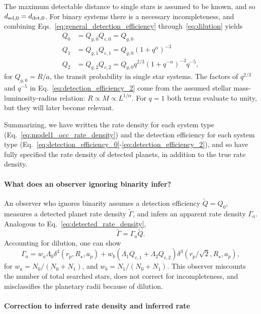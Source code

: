 The maximum detectable distance to single stars is assumed to be known, and so 
$d_{{\rm sel},0} = d_{{\rm det},0}$.
For binary systems there is a necessary incompleteness, and combining 
Eqs.~\ref{eq:general_detection_efficiency} through~\ref{eq:dilution} yields
\begin{align}
Q_0 &= Q_{g,0}Q_{c,0} = Q_{g,0} \label{eq:detection_efficiency_0}\\
Q_1 &= Q_{g,1}Q_{c,1} = Q_{g,0} (1+q^\alpha)^{-3} \\
Q_2 &= Q_{g,2}Q_{c,2} = Q_{g,0} q^{2/3} (1+q^{-\alpha})^{-3} q^{-5}, 
\label{eq:detection_efficiency_2}
\end{align}
for $Q_{g,0}=R/a$, the transit probability in single star systems.
The factors of $q^{2/3}$ and $q^{-5}$ in
Eq.~\ref{eq:detection_efficiency_2} come from the assumed stellar 
mass-luminosity-radius relation: $R\propto M \propto L^{1/\alpha}$.
For $q=1$ both terms evaluate to unity, but they will later become relevant.

Summarizing, we have written the rate density for each system type
(Eq.~\ref{eq:model1_occ_rate_density}) and the detection efficiency for each 
system type 
(Eq.~\ref{eq:detection_efficiency_0}-\ref{eq:detection_efficiency_2}),
and so have fully specified the rate density of detected planets, 
in addition to the true rate density.


\paragraph{What does an observer ignoring binarity infer?} 
An observer who ignores binarity assumes a detection efficiency 
$\tilde{Q}=Q_0$,
measures a detected planet rate density $\tilde{\Gamma}$, 
and infers an apparent rate density $\Gamma_a$.
Analogous to Eq.~\ref{eq:detected_rate_density},
\begin{equation}
\tilde{\Gamma} = \Gamma_a \tilde{Q}.
\end{equation}
Accounting for dilution, one can show
\begin{equation}
\Gamma_a = 
w_a \Lambda_0 \delta^3(r_p, R_\star, a_p) +
w_b (\Lambda_1 Q_{c,1} + \Lambda_2 Q_{c,2}) 
				\delta^3(r_p/\sqrt{2}, R_\star, a_p),
\end{equation}
for $w_a = N_0/(N_0+N_1)$, and $w_b = N_1/(N_0+N_1)$.
This observer miscounts the number of total searched stars, does not correct 
for incompleteness, and misclassifies the planetary radii because of dilution.

\paragraph{Correction to inferred rate density and inferred rate}

